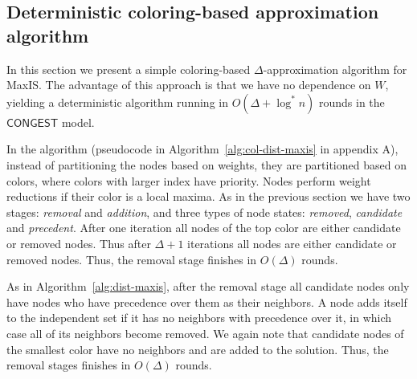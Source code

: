 \documentclass[11pt]{article}
\newcommand{\Wmax}{W}%
\begin{document}

\subsection{Deterministic coloring-based approximation algorithm}
\label{sec:deterministicMaxIS}
In this section we present a simple coloring-based $\Delta$-approximation algorithm for MaxIS. The advantage of this approach is that we have no dependence on $\Wmax$, yielding a deterministic algorithm running in $O(\Delta + \log^* n)$ rounds in the $\mathsf{CONGEST}$ model.

In the algorithm (pseudocode in Algorithm~\ref{alg:col-dist-maxis} in appendix A), instead of partitioning the nodes based on weights, they are partitioned based on colors, where colors with larger index have priority. Nodes perform weight reductions if their color is a local maxima. As in the previous section we have two stages: \emph{removal} and \emph{addition}, and three types of node states: \emph{removed}, \emph{candidate} and \emph{precedent}. After one iteration all nodes of the top color are either candidate or removed nodes. Thus after $\Delta+1$ iterations all nodes are either candidate or removed nodes. Thus, the removal stage finishes in $O(\Delta)$ rounds.

As in Algorithm~\ref{alg:dist-maxis}, after the removal stage all candidate nodes only have nodes who have precedence over them as their neighbors. A node adds itself to the independent set if it has no neighbors with precedence over it, in which case all of its neighbors become removed. We again note that candidate nodes of the smallest color have no neighbors and are added to the solution. Thus, the removal stages finishes in $O(\Delta)$ rounds.
\end{document}
